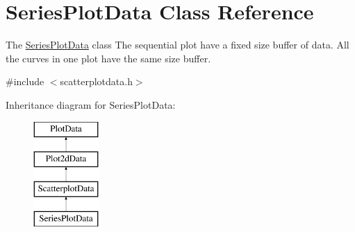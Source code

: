 \hypertarget{class_series_plot_data}{\section{\-Series\-Plot\-Data \-Class \-Reference}
\label{class_series_plot_data}
}


\-The \hyperlink{class_series_plot_data}{\-Series\-Plot\-Data} class \-The sequential plot have a fixed size buffer of data. \-All the curves in one plot have the same size buffer.  




{\ttfamily \#include $<$scatterplotdata.\-h$>$}

\-Inheritance diagram for \-Series\-Plot\-Data\-:\begin{figure}[H]
\begin{center}
\leavevmode
\includegraphics[height=4.000000cm]{class_series_plot_data}
\end{center}
\end{figure}
